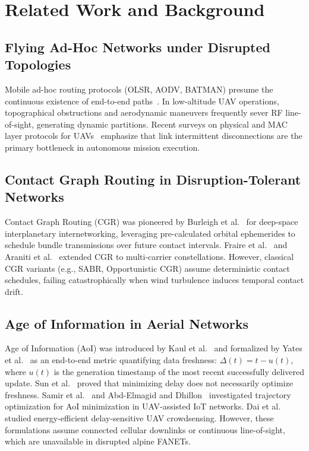 \documentclass[preprint,12pt,5p,twocolumn]{elsarticle}
\begin{document}
\section{Related Work and Background}
\label{sec:related_work}

\subsection{Flying Ad-Hoc Networks under Disrupted Topologies}
Mobile ad-hoc routing protocols (OLSR, AODV, BATMAN) presume the continuous existence of end-to-end paths~\cite{bekmezci2013flying}. In low-altitude UAV operations, topographical obstructions and aerodynamic maneuvers frequently sever RF line-of-sight, generating dynamic partitions. Recent surveys on physical and MAC layer protocols for UAVs~\cite{guillen2021review, chriki2019fanet} emphasize that link intermittent disconnections are the primary bottleneck in autonomous mission execution.

\subsection{Contact Graph Routing in Disruption-Tolerant Networks}
Contact Graph Routing (CGR) was pioneered by Burleigh et al.~\cite{burleigh2011contact} for deep-space interplanetary internetworking, leveraging pre-calculated orbital ephemerides to schedule bundle transmissions over future contact intervals. Fraire et al.~\cite{fraire2017routing} and Araniti et al.~\cite{arani2015contact} extended CGR to multi-carrier constellations. However, classical CGR variants (e.g., SABR, Opportunistic CGR) assume deterministic contact schedules, failing catastrophically when wind turbulence induces temporal contact drift.

\subsection{Age of Information in Aerial Networks}
Age of Information (AoI) was introduced by Kaul et al.~\cite{kaul2012real} and formalized by Yates et al.~\cite{yates2021age} as an end-to-end metric quantifying data freshness: $\Delta(t) = t - u(t)$, where $u(t)$ is the generation timestamp of the most recent successfully delivered update. Sun et al.~\cite{sun2017update} proved that minimizing delay does not necessarily optimize freshness. Samir et al.~\cite{samir2020age} and Abd-Elmagid and Dhillon~\cite{abdelmagid2019average} investigated trajectory optimization for AoI minimization in UAV-assisted IoT networks. Dai et al.~\cite{dai2023delay} studied energy-efficient delay-sensitive UAV crowdsensing. However, these formulations assume connected cellular downlinks or continuous line-of-sight, which are unavailable in disrupted alpine FANETs.
\end{document}

